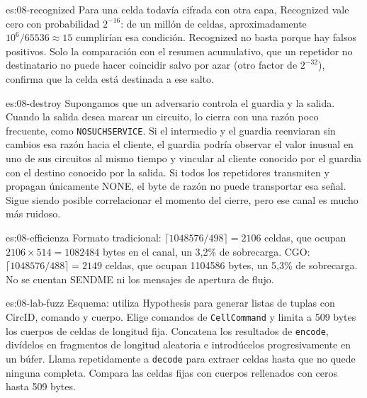 \begin{soluzione}{es:08-recognized}
Para una celda todavía cifrada con otra capa, Recognized vale cero con probabilidad $2^{-16}$: de un millón de celdas, aproximadamente $10^6/65536\approx15$ cumplirían esa condición. Recognized no basta porque hay falsos positivos. Solo la comparación con el resumen acumulativo, que un repetidor no destinatario no puede hacer coincidir salvo por azar (otro factor de $2^{-32}$), confirma que la celda está destinada a ese salto.
\end{soluzione}

\begin{soluzione}{es:08-destroy}
Supongamos que un adversario controla el guardia y la salida. Cuando la salida desea marcar un circuito, lo cierra con una razón poco frecuente, como \texttt{NOSUCHSERVICE}. Si el intermedio y el guardia reenviaran sin cambios esa razón hacia el cliente, el guardia podría observar el valor inusual en uno de sus circuitos al mismo tiempo y vincular al cliente conocido por el guardia con el destino conocido por la salida. Si todos los repetidores transmiten y propagan únicamente NONE, el byte de razón no puede transportar esa señal. Sigue siendo posible correlacionar el momento del cierre, pero ese canal es mucho más ruidoso.
\end{soluzione}

\begin{soluzione}{es:08-efficienza}
Formato tradicional: $\lceil1048576/498\rceil=2106$ celdas, que ocupan $2106\times514=\num{1082484}$ bytes en el canal, un 3,2\% de sobrecarga. CGO: $\lceil1048576/488\rceil=2149$ celdas, que ocupan \num{1104586} bytes, un 5,3\% de sobrecarga. No se cuentan SENDME ni los mensajes de apertura de flujo.
\end{soluzione}

\begin{soluzione}{es:08-lab-fuzz}
Esquema: utiliza Hypothesis para generar listas de tuplas con CircID, comando y cuerpo. Elige comandos de \texttt{CellCommand} y limita a 509 bytes los cuerpos de celdas de longitud fija. Concatena los resultados de \texttt{encode}, divídelos en fragmentos de longitud aleatoria e introdúcelos progresivamente en un búfer. Llama repetidamente a \texttt{decode} para extraer celdas hasta que no quede ninguna completa. Compara las celdas fijas con cuerpos rellenados con ceros hasta 509 bytes.
\end{soluzione}

